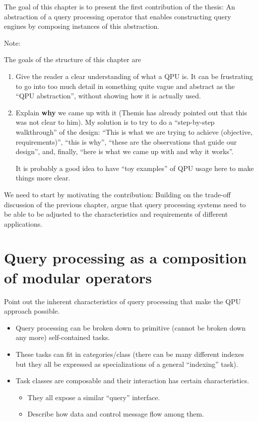 The goal of this chapter is to present the first contribution of the thesis:
An abstraction of a query processing operator that enables constructing query
engines by composing instances of this abstraction.

\begin{tcolorbox}
Note:

The goals of the structure of this chapter are
\begin{enumerate}
  \item Give the reader a clear understanding of what a QPU is.
  It can be frustrating to go into too much detail in something quite vague and
  abstract as the ``QPU abstraction'', without showing how it is actually used.
  \item Explain \textbf{why} we came up with it (Themis has already pointed out
  that this was not clear to him).
  My solution is to try to do a ``step-by-step walkthrough'' of the design:
  ``This is what we are trying to achieve (objective, requirements)'', ``this
  is why'', ``these are the observations that guide our design'', and, finally,
  ``here is what we came up with and why it works''.

  It is probably a good idea to have ``toy examples'' of QPU usage here to make
  things more clear.
\end{enumerate}
\end{tcolorbox}

We need to start by motivating the contribution:
Building on the trade-off discussion of the previous chapter, argue that query
processing systems need to be able to be adjusted to the characteristics and
requirements of different applications.

\section{Query processing as a composition of modular operators}
Point out the inherent characteristics of query processing that make the QPU
approach possible.
\begin{itemize}
  \item Query processing can be broken down to primitive (cannot be broken down
  any more) self-contained tasks.
  \item These tasks can fit in categories/class (there can be many
  different indexes but they all be expressed as specializations of a general
  ``indexing'' task).
  \item Task classes are composable and their interaction has certain
  characteristics.
  \begin{itemize}
    \item They all expose a similar ``query'' interface.
    \item Describe how data and control message flow among them.
  \end{itemize}
\end{itemize}

